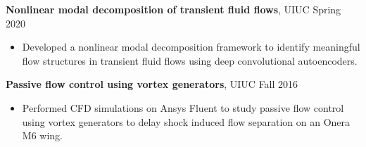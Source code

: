 \documentclass[margin]{res}
\begin{document}
\begin{resume}
{\bf Nonlinear modal decomposition of transient fluid flows}, UIUC \hfill Spring 2020
\begin{itemize}
\item Developed a nonlinear modal decomposition framework to identify meaningful flow structures in transient fluid flows using deep convolutional autoencoders.
\end{itemize}

{\bf Passive flow control using vortex generators}, UIUC \hfill Fall 2016
\begin{itemize}
\item Performed CFD simulations on Ansys Fluent to study passive flow control using vortex generators to delay shock induced flow separation on an Onera M6 wing.
\end{itemize}

		 



\end{resume}
\end{document}
